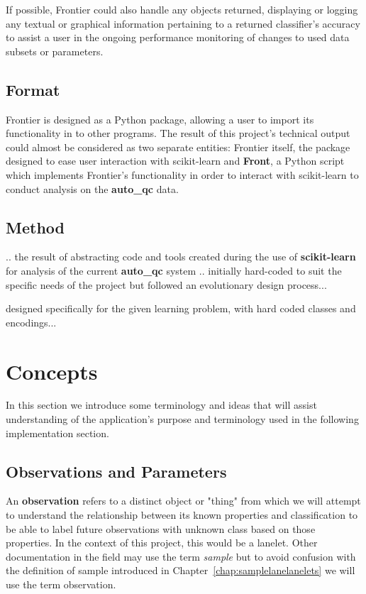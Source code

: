If possible, Frontier could also handle any objects returned, displaying or
logging any textual or graphical information pertaining to a returned
classifier's accuracy to assist a user in the ongoing performance monitoring of
changes to used data subsets or parameters.


\subsection{Format}

Frontier is designed as a Python package, allowing a user to import its
functionality in to other programs. The result of this project's technical
output could almost be considered as two separate entities: Frontier itself, the
package designed to ease user interaction with scikit-learn and \textbf{Front},
a Python script which implements Frontier's functionality in order to interact
with scikit-learn to conduct analysis on the \textbf{auto\_qc} data.


\subsection{Method}
\label{sec:frontier-method}

.. the result of abstracting code and tools created during the use of
\textbf{scikit-learn} for analysis of the current \textbf{auto\_qc} system
.. initially hard-coded to suit the specific needs of the project but followed
an evolutionary design process...

designed specifically for the given learning problem, with hard coded
classes and encodings...


\section{Concepts}

In this section we introduce some terminology and ideas that will assist
understanding of the application's purpose and terminology used in the following
implementation section.


\subsection{Observations and Parameters}

An \textbf{observation} refers to a distinct object or "thing" from which we
will attempt to understand the relationship between its known properties and
classification to be able to label future observations with unknown class based
on those properties. In the context of this project, this would be a lanelet.
Other documentation in the field may use the term \textit{sample} but to avoid
confusion with the definition of sample introduced in
Chapter~\ref{chap:samplelanelanelets} we will use the term observation.

